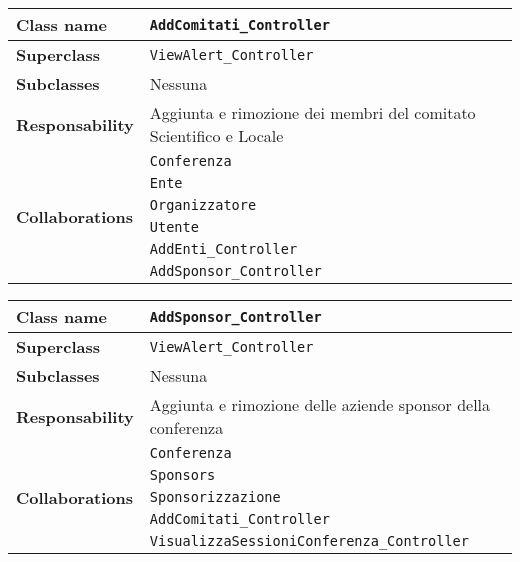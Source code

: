 \begin{table}[h!]
	\begin{tabular}{|l|l|}
		\hline 
		\textbf{Class name} & \texttt{AddComitati\_Controller}
		\\ \hline
		\textbf{Superclass} & \texttt{ViewAlert\_Controller}
		\\ \hline
		\multirow{1}{*}{\textbf{Subclasses}} & Nessuna
		\\ \hline
		\textbf{Responsability} & Aggiunta e rimozione dei membri del comitato Scientifico e Locale
		\\ \hline
		\multirow{6}{*}{\textbf{Collaborations}} & \texttt{Conferenza} \\
		& \texttt{Ente} \\
		& \texttt{Organizzatore} \\
		& \texttt{Utente} \\
		& \texttt{AddEnti\_Controller} \\
		& \texttt{AddSponsor\_Controller}
		\\ \hline
	\end{tabular}
\end{table}

\begin{table}[h!]
	\begin{tabular}{|l|l|}
		\hline 
		\textbf{Class name} & \texttt{AddSponsor\_Controller}
		\\ \hline
		\textbf{Superclass} & \texttt{ViewAlert\_Controller}
		\\ \hline
		\multirow{1}{*}{\textbf{Subclasses}} & Nessuna
		\\ \hline
		\textbf{Responsability} & Aggiunta e rimozione delle aziende sponsor della conferenza
		\\ \hline
		\multirow{5}{*}{\textbf{Collaborations}} & \texttt{Conferenza }\\
		& \texttt{Sponsors}\\
		& \texttt{Sponsorizzazione}\\
		& \texttt{AddComitati\_Controller}\\
		& \texttt{VisualizzaSessioniConferenza\_Controller}
		\\ \hline
	\end{tabular}
\end{table}


